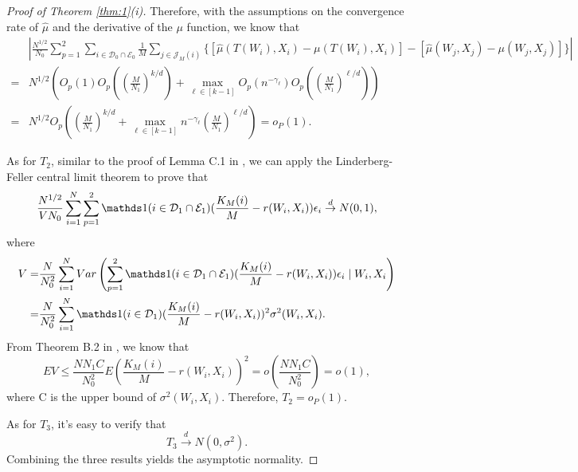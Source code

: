 \documentclass[11pt]{article}
\numberwithin{equation}{section}
\theoremstyle{definition}
\begin{document}
\begin{proof}[Proof of Theorem \ref{thm:1}(i)]
Therefore, with the assumptions on the convergence rate of $\hat{\mu}$ and the derivative of the $\mu$ function, we know that
\begin{align*}
&\left|\frac{N^{1/2}}{N_0}\sum_{p=1}^2\sum_{i\in \mathcal{D}_0\cap\mathcal{E}_0}\frac{1}{M}\sum_{j\in\mathcal{J}_M(i)}\{[\widehat{\mu}(T(W_i),X_i)-\mu(T(W_i),X_i)]-[\widehat{\mu}(W_j,X_j)-\mu(W_j,X_j)]\}\right| \\
=& N^{1/2}\left(O_p(1)O_p\left(\left(\frac{M}{N_1}\right)^{k/d}\right) + \max_{\ell \in [k-1]} O_p(n^{-\gamma_{\ell}}) O_p\left(\left(\frac{M}{N_1}\right)^{\ell/d}\right)\right)\\
=& N^{1/2}O_p\left(\left(\frac{M}{N_1}\right)^{k/d} + \max_{\ell \in [k-1]}n^{-\gamma_{\ell}} \left(\frac{M}{N_1}\right)^{\ell/d}\right)=o_P(1).
\end{align*}

As for $T_2$, similar to the proof of Lemma C.1 in \cite{lin2023estimation}, we can apply the Linderberg-Feller central limit theorem to prove that 
\[\frac{N^{1/2}}{VN_0}\sum_{i=1}^N\sum_{p=1}^2\ind(i\in\mathcal{D}_1\cap\mathcal{E}_1)(\frac{K_M(i)}{M}-r(W_i,X_i))\epsilon_i\overset{d}{\to}N(0,1),\]
where
\begin{align*}
     V=&\frac{N}{N_0^2}\sum_{i=1}^NVar\left(\sum_{p=1}^2\ind(i\in\mathcal{D}_1\cap\mathcal{E}_1)(\frac{K_M(i)}{M}-r(W_i,X_i))\epsilon_i\mid W_i,X_i\right)\\
     =&\frac{N}{N_0^2}\sum_{i=1}^N \ind(i\in\mathcal{D}_1)(\frac{K_M(i)}{M}-r(W_i,X_i))^2\sigma^2(W_i,X_i).
\end{align*}
From Theorem B.2 in \cite{lin2023estimation}, we know that
\[EV\leq \frac{NN_1C}{N_0^2}E\left(\frac{K_M(i)}{M}-r(W_i,X_i)\right)^2=o\left(\frac{NN_1C}{N_0^2}\right)=o(1),\]
where C is the upper bound of $\sigma^2(W_i,X_i)$. Therefore, $T_2=o_P(1).$ 

As for $T_3$, it's easy to verify that
\[T_3\overset{d}{\to}N(0,\sigma^2).\] Combining the three results yields the asymptotic normality.
\end{proof}
\end{document}

